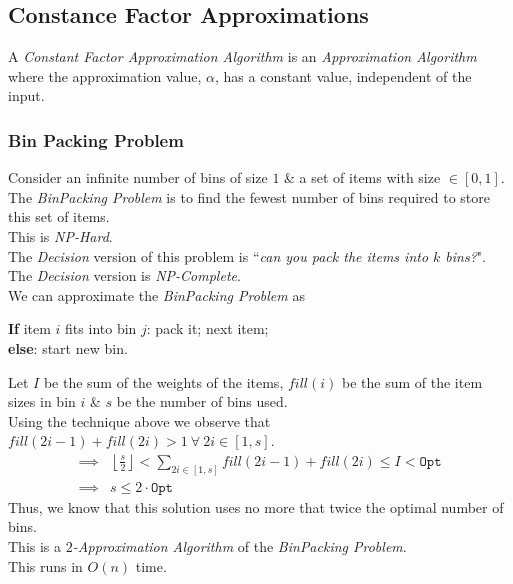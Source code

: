 \documentclass[11pt,a4paper]{article}
\begin{document}
\subsection{Constance Factor Approximations}

A \textit{Constant Factor Approximation Algorithm} is an \textit{Approximation Algorithm} where the approximation value, $\alpha$, has a constant value, independent of the input.


\subsubsection{Bin Packing Problem}

Consider an infinite number of bins of size $1$ \& a set of items with size $\in[0,1]$.\\
The \textit{BinPacking Problem} is to find the fewest number of bins required to store this set of items.\\
This is \textit{NP-Hard}.\\
The \textit{Decision} version of this problem is ``\textit{can you pack the items into $k$ bins?}".\\
The \textit{Decision} version is \textit{NP-Complete}.\\

We can approximate the \textit{BinPacking Problem} as
\begin{center}
\textbf{If} item $i$ fits into bin $j$: pack it; next item;\\
\textbf{else}: start new bin.
\end{center}
Let $I$ be the sum of the weights of the items, $fill(i)$ be the sum of the item sizes in bin $i$ \& $s$ be the number of bins used.\\
Using the technique above we observe that $fill(2i-1)+fill(2i)>1\ \forall\ 2i\in[1,s]$.
\[\begin{array}{rl}
\implies&\left\lfloor\frac{s}2\right\rfloor<\sum_{2i\in[1,s]}fill(2i-1)+fill(2i)\leq I<\mathtt{Opt}\\
\implies&s\leq2\cdot\mathtt{Opt}
\end{array}\]
Thus, we know that this solution uses no more that twice the optimal number of bins.\\
This is a \textit{$2$-Approximation Algorithm} of the \textit{BinPacking Problem}.\\
\nb This runs in $O(n)$ time.\\
\end{document}
